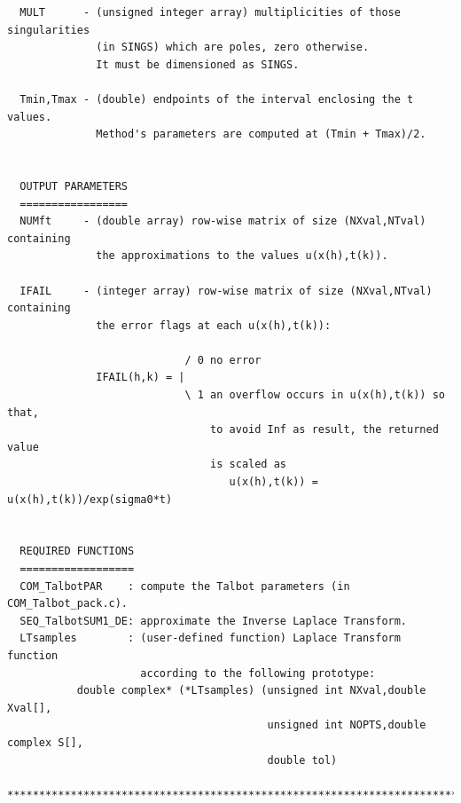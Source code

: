 \documentclass[a4paper,10pt]{report}%
\begin{document}
\begin{lstlisting}
  MULT      - (unsigned integer array) multiplicities of those singularities
              (in SINGS) which are poles, zero otherwise.
              It must be dimensioned as SINGS.

  Tmin,Tmax - (double) endpoints of the interval enclosing the t values.
              Method's parameters are computed at (Tmin + Tmax)/2.


  OUTPUT PARAMETERS
  =================
  NUMft     - (double array) row-wise matrix of size (NXval,NTval) containing
              the approximations to the values u(x(h),t(k)).

  IFAIL     - (integer array) row-wise matrix of size (NXval,NTval) containing
              the error flags at each u(x(h),t(k)):

                            / 0 no error
              IFAIL(h,k) = |
                            \ 1 an overflow occurs in u(x(h),t(k)) so that,
                                to avoid Inf as result, the returned value
                                is scaled as
                                   u(x(h),t(k)) = u(x(h),t(k))/exp(sigma0*t)


  REQUIRED FUNCTIONS
  ==================
  COM_TalbotPAR    : compute the Talbot parameters (in COM_Talbot_pack.c).
  SEQ_TalbotSUM1_DE: approximate the Inverse Laplace Transform.
  LTsamples        : (user-defined function) Laplace Transform function
                     according to the following prototype:
           double complex* (*LTsamples) (unsigned int NXval,double Xval[],
                                         unsigned int NOPTS,double complex S[],
                                         double tol)

*****************************************************************************\
\end{lstlisting}
\end{document}
